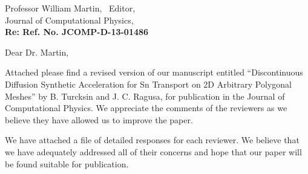 \begin{letter}{Professor William Martin, \  Editor,\\
    Journal of Computational Physics,\\
\textbf{Re: Ref. No. JCOMP-D-13-01486}}


\date{\today}

\opening{Dear Dr. Martin,}
         \vspace{0.25cm}

Attached please find a revised version of our manuscript entitled
``Discontinuous Diffusion Synthetic Acceleration for Sn Transport on 2D Arbitrary Polygonal Meshes'' 
by B. Turcksin and J. C. Ragusa, for
publication in the Journal of Computational Physics. We appreciate the comments of the reviewers as we
believe they have allowed us to improve the paper.

We have attached a file of detailed responses for each reviewer.
We believe that we have adequately addressed all of their concerns and hope that our paper will be found suitable for publication.


\end{letter}
